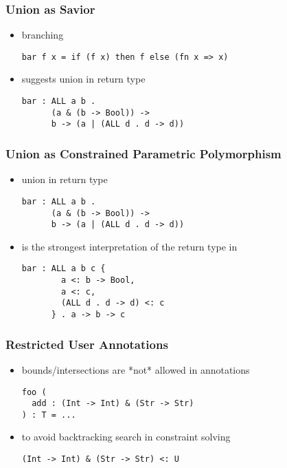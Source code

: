 \documentclass{beamer}
\begin{document}
\begin{frame}[fragile]
  \frametitle{Union as Savior}

  \begin{itemize}
  \item branching  
  \begin{lstlisting}
bar f x = if (f x) then f else (fn x => x)
  \end{lstlisting}

  \item suggests union in return type 
  \begin{lstlisting}
bar : ALL a b . 
      (a & (b -> Bool)) -> 
      b -> (a | (ALL d . d -> d))
  \end{lstlisting}
  \end{itemize}
\end{frame}


\begin{frame}[fragile]
  \frametitle{Union as Constrained Parametric Polymorphism}

  \begin{itemize}
  \item union in return type 
  \begin{lstlisting}
bar : ALL a b . 
      (a & (b -> Bool)) -> 
      b -> (a | (ALL d . d -> d))
  \end{lstlisting}
  \item is the strongest interpretation of the return type in 
  \begin{lstlisting}
bar : ALL a b c {
        a <: b -> Bool, 
        a <: c, 
        (ALL d . d -> d) <: c
      } . a -> b -> c
  \end{lstlisting}
  \end{itemize}
\end{frame}


\begin{frame}[fragile]
  \frametitle{Restricted User Annotations}

  \begin{itemize}
  \item bounds/intersections are *not* allowed in annotations 
  \begin{lstlisting}
foo (
  add : (Int -> Int) & (Str -> Str)
) : T = ...
  \end{lstlisting}
  \item to avoid backtracking search in constraint solving 
  \begin{lstlisting}
(Int -> Int) & (Str -> Str) <: U
  \end{lstlisting}
  \end{itemize}
\end{frame}
\end{document}
